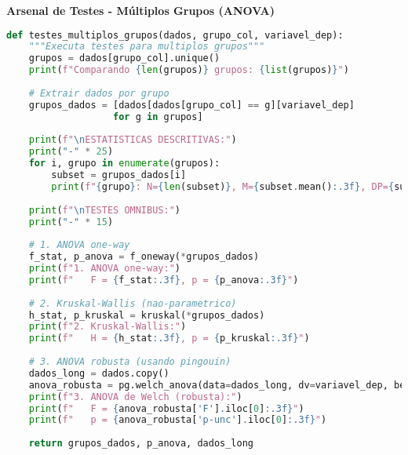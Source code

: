 \begin{examplebox}
\textbf{Arsenal de Testes - Múltiplos Grupos (ANOVA)}

\begin{lstlisting}[language=Python]
def testes_multiplos_grupos(dados, grupo_col, variavel_dep):
    """Executa testes para multiplos grupos"""
    grupos = dados[grupo_col].unique()
    print(f"Comparando {len(grupos)} grupos: {list(grupos)}")
    
    # Extrair dados por grupo
    grupos_dados = [dados[dados[grupo_col] == g][variavel_dep] 
                   for g in grupos]
    
    print(f"\nESTATISTICAS DESCRITIVAS:")
    print("-" * 25)
    for i, grupo in enumerate(grupos):
        subset = grupos_dados[i]
        print(f"{grupo}: N={len(subset)}, M={subset.mean():.3f}, DP={subset.std():.3f}")
    
    print(f"\nTESTES OMNIBUS:")
    print("-" * 15)
    
    # 1. ANOVA one-way
    f_stat, p_anova = f_oneway(*grupos_dados)
    print(f"1. ANOVA one-way:")
    print(f"   F = {f_stat:.3f}, p = {p_anova:.3f}")
    
    # 2. Kruskal-Wallis (nao-parametrico)
    h_stat, p_kruskal = kruskal(*grupos_dados)
    print(f"2. Kruskal-Wallis:")
    print(f"   H = {h_stat:.3f}, p = {p_kruskal:.3f}")
    
    # 3. ANOVA robusta (usando pingouin)
    dados_long = dados.copy()
    anova_robusta = pg.welch_anova(data=dados_long, dv=variavel_dep, between=grupo_col)
    print(f"3. ANOVA de Welch (robusta):")
    print(f"   F = {anova_robusta['F'].iloc[0]:.3f}")
    print(f"   p = {anova_robusta['p-unc'].iloc[0]:.3f}")
    
    return grupos_dados, p_anova, dados_long
\end{lstlisting}
\end{examplebox}

